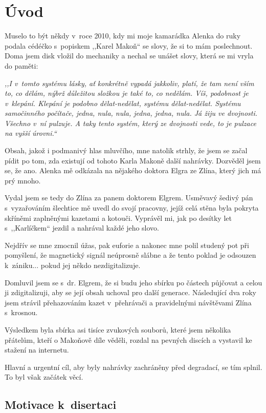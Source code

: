\chapter{Úvod}
\label{kap:uvod}

Muselo to být někdy v~roce 2010, kdy mi moje kamarádka Alenka do ruky podala
cédéčko s~popiskem ,,Karel Makoň`` se slovy, že si to mám poslechnout. Doma jsem
disk vložil do mechaniky a nechal se unášet slovy, která se mi vryla do paměti:

{\em ,,I v~tomto systému lásky, ať konkrétně vypadá jakkoliv, platí, že tam není
vším to, co dělám, nýbrž důležitou složkou je také to, co nedělám. Víš,
podobnost je v~klepání. Klepání je podobno dělat-nedělat, systému dělat-nedělat.
Systému samočinného počítače, jedna, nula, nula, jedna, jedna, nula. Já
žiju ve dvojnosti. Všechno v~ní pulzuje. A taky tento systém, který ze dvojnosti
vede, to je pulzace na vyšší úrovni.``}

Obsah, jakož i podmanivý hlas mluvčího, mne natolik strhly, že jsem se začal
pídit po tom, zda existují od tohoto Karla Makoně další nahrávky. Dozvěděl jsem
se, že ano. Alenka mě odkázala na nějakého doktora Elgra ze Zlína, který jich má
prý mnoho.

Vydal jsem se tedy do Zlína za panem doktorem Elgrem. Usměvavý šedivý pán
s~vyzařováním šlechtice mě uvedl do svojí pracovny, jejíž celá stěna byla
pokryta skříněmi zaplněnými kazetami a kotouči. Vyprávěl mi, jak po desítky let
s~,,Karlíčkem`` jezdil a nahrával každé jeho slovo.

Nejdřív se mne zmocnil úžas, pak euforie a nakonec mne polil studený pot při
pomyšlení, že magnetický signál neúprosně slábne a že tento poklad je odsouzen
k~zániku... pokud jej někdo nezdigitalizuje.

Domluvil jsem se s~dr. Elgrem, že si budu jeho sbírku po částech půjčovat a celou ji
zdigitalizuji, aby se její obsah uchoval pro další generace. Následující dva
roky jsem strávil přehazováním kazet v~přehrávači a pravidelnými návštěvami
Zlína s~krosnou.

Výsledkem byla sbírka asi tisíce zvukových souborů, které jsem několika přátelům,
kteří o Makoňově díle věděli, rozdal na pevných discích a vystavil ke stažení na
internetu.

Hlavní a urgentní cíl, aby byly nahrávky zachráněny před degradací, se tím
splnil. To byl však začátek věcí.

\section{Motivace k~disertaci}

